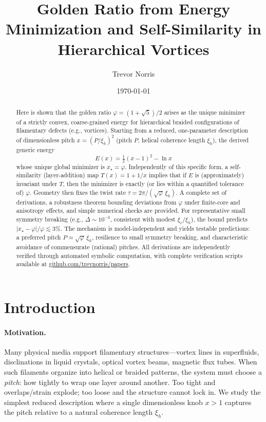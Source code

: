\documentclass[11pt]{article}
\title{Golden Ratio from Energy Minimization and Self-Similarity in Hierarchical Vortices}
\author{Trevor Norris}
\date{\small \today}
\theoremstyle{remark}
\theoremstyle{definition}
\newcommand{\ph}{\varphi}
\begin{document}
\maketitle

\begin{abstract}
Here is shown that the golden ratio $\ph=(1+\sqrt5)/2$ arises as the unique minimizer of a strictly convex, coarse-grained energy for hierarchical braided configurations of filamentary defects (e.g., vortices). Starting from a reduced, one-parameter description of dimensionless pitch $x=(P/\xi_h)^2$ (pitch $P$, helical coherence length $\xi_h$), the derived generic energy
\[
E(x)=\tfrac12(x-1)^2-\ln x
\]
whose unique global minimizer is $x_\star=\ph$. Independently of this specific form, a self-similarity (layer-addition) map $T(x)=1+1/x$ implies that if $E$ is (approximately) invariant under $T$, then the minimizer is exactly (or lies within a quantified tolerance of) $\ph$. Geometry then fixes the twist rate $\tau=2\pi/(\sqrt{\ph}\,\xi_h)$. A complete set of derivations, a robustness theorem bounding deviations from $\ph$ under finite-core and anisotropy effects, and simple numerical checks are provided. For representative small symmetry breaking (e.g., $\Delta\sim10^{-3}$, consistent with modest $\xi_c/\xi_h$), the bound predicts $|x_\star-\ph|/\ph\lesssim 3\%$. The mechanism is model-independent and yields testable predictions: a preferred pitch $P\simeq\sqrt{\ph}\,\xi_h$, resilience to small symmetry breaking, and characteristic avoidance of commensurate (rational) pitches. All derivations are independently verified through automated symbolic computation, with complete verification scripts available at \url{github.com/trevnorris/papers}.
\end{abstract}

\section{Introduction}
\paragraph{Motivation.} Many physical media support filamentary structures---vortex lines in superfluids, disclinations in liquid crystals, optical vortex beams, magnetic flux tubes. When such filaments organize into helical or braided patterns, the system must choose a \emph{pitch}: how tightly to wrap one layer around another. Too tight and overlaps/strain explode; too loose and the structure cannot lock in. We study the simplest reduced description where a single dimensionless knob $x>1$ captures the pitch relative to a natural coherence length $\xi_h$.
\end{document}

